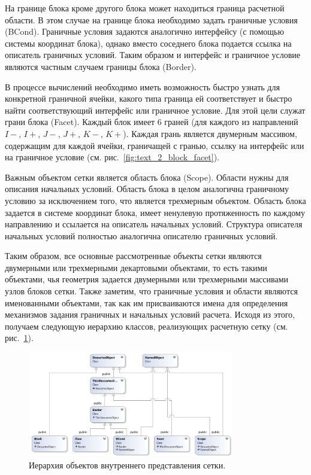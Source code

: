 На границе блока кроме другого блока может находиться граница расчетной области.
В этом случае на границе блока необходимо задать граничные условия (BCond).
Граничные условия задаются аналогично интерфейсу (с помощью системы координат блока), однако вместо соседнего блока подается ссылка на описатель граничных условий.
Таким образом и интерфейс и граничное условие являются частным случаем границы блока (Border).

В процессе вычислений необходимо иметь возможность быстро узнать для конкретной граничной ячейки, какого типа граница ей соответствует и быстро найти соответствующий интерфейс или граничное условие.
Для этой цели служат грани блока (Facet)\label{term:block_facet}.
Каждый блок имеет 6 граней (для каждого из направлений $I-$, $I+$, $J-$, $J+$, $K-$, $K+$).
Каждая грань является двумерным массивом, содержащим для каждой ячейки, граничащей с гранью, ссылку на интерфейс или на граничное условие (см. рис.~\ref{fig:text_2_block_facet}).

Важным объектом сетки является область блока (Scope)\label{term:block_scope}.
Области нужны для описания начальных условий.
Область блока в целом аналогична граничному условию за исключением того, что является трехмерным объектом.
Область блока задается в системе координат блока, имеет ненулевую протяженность по каждому направлению и ссылается на описатель начальных условий.
Структура описателя начальных условий полностью аналогична описателю граничных условий.

Таким образом, все основные рассмотренные объекты сетки являются двумерными или трехмерными декартовыми объектами, то есть такими объектами, чья геометрия задается двумерными или трехмерными массивами узлов блоков сетки.
Также заметим, что граничные условия и области являются именованными объектами, так как им присваиваются имена для определения механизмов задания граничных и начальных условий расчета.
Исходя из этого, получаем следующую иерархию классов, реализующих расчетную сетку (см. рис.~\ref{fig:text_2_block_hierarchy}).

\begin{figure}[ht]
\centering
\includegraphics[width=0.8\textwidth]{./pics/text_2_block/9-hierarchy.png}
\singlespacing
{}\caption{Иерархия объектов внутреннего представления сетки.}
\label{fig:text_2_block_hierarchy}
\end{figure}

